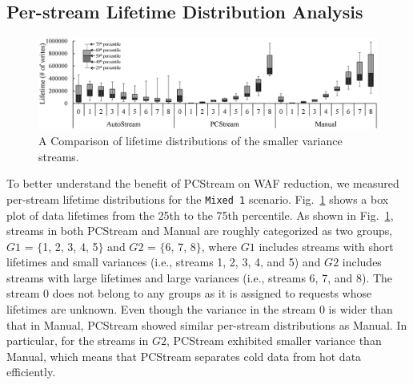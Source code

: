 \subsection{Per-stream Lifetime Distribution Analysis}

\begin{figure}[t]
	\centering
	\includegraphics[width=1\linewidth]{figure/distribution}
	\caption{A Comparison of lifetime distributions of the smaller variance streams.}
	\label{fig:distribution}
\end{figure}

To better understand the benefit of \textsf{\small PCStream} on WAF reduction,
we measured per-stream lifetime distributions for the \texttt{Mixed 1}
scenario.  Fig.~\ref{fig:distribution} shows a box plot of data lifetimes from
the 25th to the 75th percentile.  As shown in Fig.~\ref{fig:distribution},
streams in both \textsf{\small PCStream} and Manual are roughly categorized as
two groups, $G1$ = $\{$1, 2, 3, 4, 5$\}$ and $G2$ = $\{$6, 7, 8$\}$, where $G1$
includes streams with short lifetimes and small variances (i.e., streams 1, 2,
3, 4, and 5) and $G2$ includes streams with large lifetimes and large variances
(i.e., streams 6, 7, and 8). The stream 0 does not belong to any groups as it
is assigned to requests whose lifetimes are unknown.  Even though the variance
in the stream 0 is wider than that in Manual, PCStream showed similar
per-stream distributions as Manual. In particular, for the streams in $G2$,
PCStream exhibited smaller variance than Manual, which means that PCStream
separates cold data from hot data efficiently.

